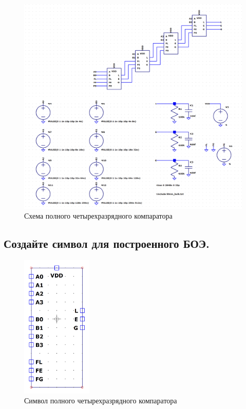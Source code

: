 \documentclass[12pt,onecolumn]{article}
\begin{document}
\begin{figure}[H]
    \centering
    \includegraphics[width=\textwidth]{image/full-comparator.png}
    \caption{Схема полного четырехразрядного компаратора}
\end{figure}
\subsection{Создайте символ для построенного БОЭ.}
\begin{figure}[H]
    \centering
    \includegraphics[width=0.3\textwidth]{image/full-comparator-sym.png}
    \caption{Символ полного четырехразрядного компаратора}
\end{figure}
\end{document}
